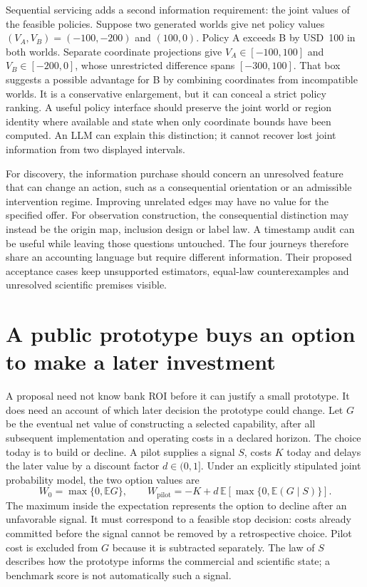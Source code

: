 Sequential servicing adds a second information requirement: the joint values
of the feasible policies. Suppose two generated worlds give net policy values
$(V_A,V_B)=(-100,-200)$ and $(100,0)$. Policy A exceeds B by USD~100 in both
worlds. Separate coordinate projections give $V_A\in[-100,100]$ and
$V_B\in[-200,0]$, whose unrestricted difference spans $[-300,100]$. That
box suggests a possible advantage for B by combining coordinates from
incompatible worlds. It is a conservative enlargement, but it can conceal a
strict policy ranking. A useful policy interface should preserve the joint
world or region identity where available and state when only coordinate
bounds have been computed. An LLM can explain this distinction; it cannot
recover lost joint information from two displayed intervals.
\citep{exec14_l8_economics}

For discovery, the information purchase should concern an unresolved feature
that can change an action, such as a consequential orientation or an admissible
intervention regime. Improving unrelated edges may have no value for the
specified offer. For observation construction, the consequential distinction
may instead be the origin map, inclusion design or label law. A timestamp
audit can be useful while leaving those questions untouched. The four journeys
therefore share an accounting language but require different information.
Their proposed acceptance cases keep unsupported estimators, equal-law
counterexamples and unresolved scientific premises visible.
\citep{exec14_l8_design}

\section{A public prototype buys an option to make a later investment}
\label{exec14:l8-option}

A proposal need not know bank ROI before it can justify a small prototype.
It does need an account of which later decision the prototype could change.
Let $G$ be the eventual net value of constructing a selected capability, after
all subsequent implementation and operating costs in a declared horizon.
The choice today is to build or decline. A pilot supplies a signal $S$, costs
$K$ today and delays the later value by a discount factor $d\in(0,1]$.
Under an explicitly stipulated joint probability model, the two option values
are
\[
 W_0=\max\{0,\mathbb E G\},\qquad
 W_{\mathrm{pilot}}=-K+d\,\mathbb E[\max\{0,\mathbb E(G\mid S)\}].
\]
The maximum inside the expectation represents the option to decline after
an unfavorable signal. It must correspond to a feasible stop decision: costs
already committed before the signal cannot be removed by a retrospective
choice. Pilot cost is excluded from $G$ because it is subtracted separately.
The law of $S$ describes how the prototype informs the commercial and scientific
state; a benchmark score is not automatically such a signal.
\citep{exec14_l8_economics}

